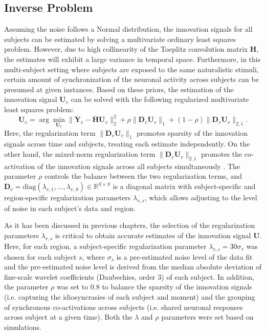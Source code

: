 \subsection{Inverse Problem}
\label{sec:inverse_problem_mspfm}
Assuming the noise follows a Normal distribution, the innovation signals for all
subjects can be estimated by solving a multivariate ordinary least squares
problem. However, due to high collinearity of the Toeplitz convolution matrix
$\mathbf{H}$, the estimates will exhibit a large variance in temporal space.
Furthermore, in this multi-subject setting where subjects are exposed to the
same naturalistic stimuli, certain amount of synchronization of the neuronal
activity across subjects can be presumed at given instances. Based on these
priors, the estimation of the innovation signal $\mathbf{U}_v$ can be solved
with the following regularized multivariate least squares problem:
\begin{equation}
\label{eq:inverse_problem_multi_subject}
\mathbf{U}_v = \arg \min_{\mathbf{U}_v} \| \overline{\mathbf{Y}}_v - \overline{\mathbf{H}} \mathbf{U}_v \|_2^2 + \rho \| \mathbf{D}_v \mathbf{U}_v \|_{1} + (1 - \rho) \| \mathbf{D}_v \mathbf{U}_v \|_{2,1}.
\end{equation}
Here, the regularization term $\| \mathbf{D}_v \mathbf{U}_v \|_{1}$ promotes
sparsity of the innovation signals across time and subjects, treating each
estimate independently. On the other hand, the mixed-norm regularization term
$\| \mathbf{D}_v \mathbf{U}_v \|_{2,1}$ promotes the co-activation of the
innovation signals across all subjects simultaneously
\citep{Gramfort2011FunctionalBrainImaging, Urunuela2022Wholebrainmultivariate}.
The parameter $\rho$ controls the balance between the two regularization terms,
and $\mathbf{D}_v = \text{diag}(\lambda_{v,1}, \dots, \lambda_{v,S}) \in
\mathbb{R}^{S \times S}$ is a diagonal matrix with subject-specific and
region-specific regularization parameters $\lambda_{v,s}$, which allows
adjusting to the level of noise in each subject's data and region. 

As it has been discussed in previous chapters, the selection of the
regularization parameters $\lambda_{v,s}$ is critical to obtain accurate
estimates of the innovation signal $\mathbf{U}$. Here, for each region, a
subject-specific regularization parameter $\lambda_{v,s} = 30 \sigma_s$ was
chosen for each subject $s$, where $\sigma_s$ is a pre-estimated noise level of
the data fit and the pre-estimated noise level is derived from the median
absolute deviation of fine-scale wavelet coefficients (Daubechies, order 3) of
each subject. In addition, the parameter $\rho$ was set to 0.8 to balance the
sparsity of the innovation signals (i.e. capturing the idiosyncrasies of each
subject and moment) and the grouping of synchronous co-activations across
subjects (i.e. shared neuronal responses across subject at a given time). Both
the $\lambda$ and $\rho$ parameters were set based on simulations.

